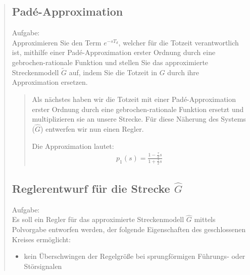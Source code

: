 \begin{quote}
\begin{quote}
    \end{quote}
    
    
    \subsection{Pad\'e-Approximation}
    
    Aufgabe:\\
    Approximieren Sie den Term $e^{-sT_d}$, welcher für die Totzeit verantwortlich ist, mithilfe einer
    Pad\'e-Approximation erster Ordnung durch eine gebrochen-rationale Funktion und stellen Sie das approximierte
    Streckenmodell $\tilde{G}$ auf, indem Sie die Totzeit in $G$ durch ihre Approximation ersetzen. \vspace{1em}
    
    \begin{quote}
        
        Als nächstes haben wir die Totzeit mit einer Pad\'e-Approximation erster Ordnung durch eine gebrochen-rationale
        Funktion ersetzt und multiplizieren sie an unsere Strecke. Für diese Näherung des Systems ($\hat{G}$) entwerfen
        wir nun einen Regler.\vspace{1em}
        
        Die Approximation lautet:
        \begin{equation*}
        	\begin{split}
        		p_1(s) = \frac{1-\frac{\tau}{2}s}{1+\frac{\tau}{2}s}
        	\end{split}
        \end{equation*}
        
    \end{quote}
    
    \subsection{Reglerentwurf für die Strecke $\hat{G}$}
    Aufgabe:\\
    Es soll ein Regler für das approximierte Streckenmodell $\hat{G}$ mittels Polvorgabe entworfen werden, der
    folgende Eigenschaften des geschlossenen Kreises ermöglicht:
        
        \begin{itemize}
            
            \item kein Überschwingen der Regelgröße bei sprungförmigen Führungs- oder Störsignalen
            

\end{itemize}
\end{quote}
